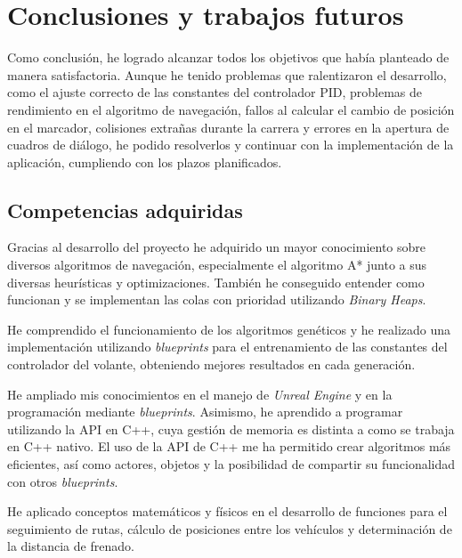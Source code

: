 

\chapter{Conclusiones y trabajos futuros}
Como conclusión, he logrado alcanzar todos los objetivos que había planteado de manera satisfactoria. Aunque he tenido problemas que ralentizaron el desarrollo, como el ajuste correcto de las constantes del controlador PID, problemas de rendimiento en el algoritmo de navegación, fallos al calcular el cambio de posición en el marcador, colisiones extrañas durante la carrera y errores en la apertura de cuadros de diálogo, he podido resolverlos y continuar con la implementación de la aplicación, cumpliendo con los plazos planificados.


\section{Competencias adquiridas}

Gracias al desarrollo del proyecto he adquirido un mayor conocimiento sobre diversos algoritmos de navegación, especialmente el algoritmo A* junto a sus diversas heurísticas y optimizaciones. También he conseguido entender como funcionan y se implementan las colas con prioridad utilizando \textit{Binary Heaps}.

\bigskip
 
He comprendido el funcionamiento de los algoritmos genéticos y he realizado una implementación utilizando \textit{blueprints} para el entrenamiento de las constantes del controlador del volante, obteniendo mejores resultados en cada generación.

\bigskip

He ampliado mis conocimientos en el manejo de \textit{Unreal Engine} y en la programación mediante \textit{blueprints}. Asimismo, he aprendido a programar utilizando la API en C++, cuya gestión de memoria es distinta a como se trabaja en C++ nativo. El uso de la API de C++ me ha permitido crear algoritmos más eficientes, así como actores, objetos y la posibilidad de compartir su funcionalidad con otros \textit{blueprints}.

\bigskip

He aplicado conceptos matemáticos y físicos en el desarrollo de funciones para el seguimiento de rutas, cálculo de posiciones entre los vehículos y determinación de la distancia de frenado.

